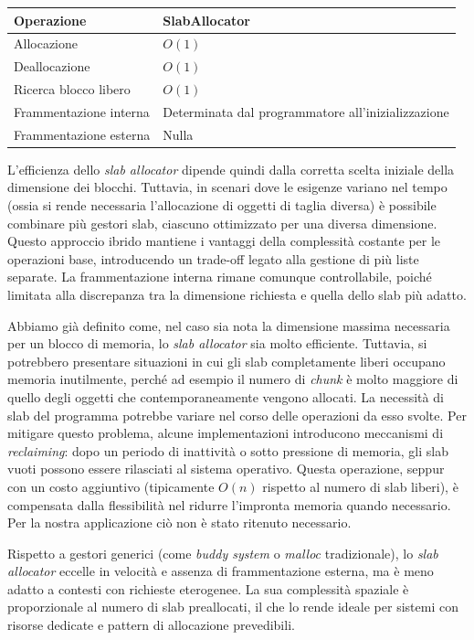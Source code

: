 \begin{center}
\begin{tabular}{|l|l|}
\hline
Operazione & SlabAllocator \\
\hline
Allocazione & $O(1)$ \\
Deallocazione & $O(1)$ \\
Ricerca blocco libero & $O(1)$ \\
Frammentazione interna & Determinata dal programmatore all'inizializzazione \\
Frammentazione esterna & Nulla \\
\hline
\end{tabular}
\end{center}

L’efficienza dello \textit{slab allocator} dipende quindi dalla corretta scelta iniziale della dimensione dei blocchi. Tuttavia, in scenari dove le esigenze variano nel tempo (ossia si rende necessaria l’allocazione di oggetti di taglia diversa) è possibile combinare più gestori slab, ciascuno ottimizzato per una diversa dimensione. Questo approccio ibrido mantiene i vantaggi della complessità costante per le operazioni base, introducendo un trade-off legato alla gestione di più liste separate. La frammentazione interna rimane comunque controllabile, poiché limitata alla discrepanza tra la dimensione richiesta e quella dello slab più adatto.

Abbiamo già definito come, nel caso sia nota la dimensione massima necessaria per un blocco di memoria, lo \textit{slab allocator} sia molto efficiente. Tuttavia, si potrebbero presentare situazioni in cui gli slab completamente liberi occupano memoria inutilmente, perché ad esempio il numero di \textit{chunk} è molto maggiore di quello degli oggetti che contemporaneamente vengono allocati. La necessità di slab del programma potrebbe variare nel corso delle operazioni da esso svolte. Per mitigare questo problema, alcune implementazioni introducono meccanismi di \textit{reclaiming}: dopo un periodo di inattività o sotto pressione di memoria, gli slab vuoti possono essere rilasciati al sistema operativo. Questa operazione, seppur con un costo aggiuntivo (tipicamente $O(n)$ rispetto al numero di slab liberi), è compensata dalla flessibilità nel ridurre l’impronta memoria quando necessario. Per la nostra applicazione ciò non è stato ritenuto necessario.

Rispetto a gestori generici (come \textit{buddy system} o \textit{malloc} tradizionale), lo \textit{slab allocator} eccelle in velocità e assenza di frammentazione esterna, ma è meno adatto a contesti con richieste eterogenee. La sua complessità spaziale è proporzionale al numero di slab preallocati, il che lo rende ideale per sistemi con risorse dedicate e pattern di allocazione prevedibili.

